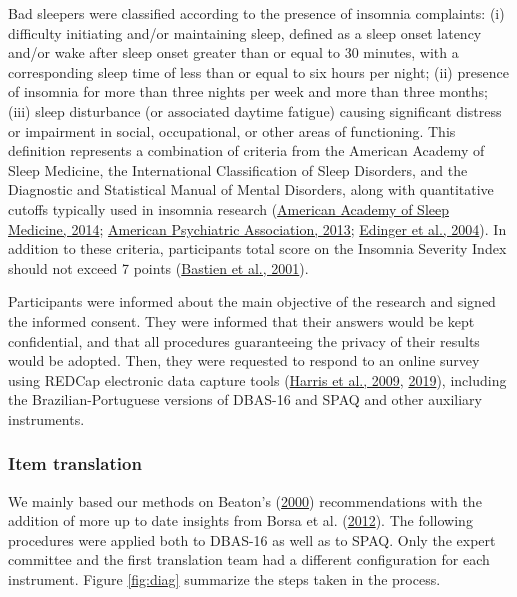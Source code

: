 \documentclass[
  ,doc,11pt, twoside,floatsintext]{apa6}
\begin{document}
Bad sleepers were classified according to the presence of insomnia complaints: (i) difficulty initiating and/or maintaining sleep, defined as a sleep onset latency and/or wake after sleep onset greater than or equal to 30 minutes, with a corresponding sleep time of less than or equal to six hours per night; (ii) presence of insomnia for more than three nights per week and more than three months; (iii) sleep disturbance (or associated daytime fatigue) causing significant distress or impairment in social, occupational, or other areas of functioning. This definition represents a combination of criteria from the American Academy of Sleep Medicine, the International Classification of Sleep Disorders, and the Diagnostic and Statistical Manual of Mental Disorders, along with quantitative cutoffs typically used in insomnia research (\protect\hyperlink{ref-icds2014}{American Academy of Sleep Medicine, 2014}; \protect\hyperlink{ref-americanpsychiatricassociation2013}{American Psychiatric Association, 2013}; \protect\hyperlink{ref-edinger2004}{Edinger et al., 2004}). In addition to these criteria, participants total score on the Insomnia Severity Index should not exceed 7 points (\protect\hyperlink{ref-bastien2001}{Bastien et al., 2001}).

Participants were informed about the main objective of the research and signed the informed consent. They were informed that their answers would be kept confidential, and that all procedures
guaranteeing the privacy of their results would be adopted. Then, they were requested to respond to an online survey using REDCap electronic data capture tools (\protect\hyperlink{ref-harris2009research}{Harris et al., 2009}, \protect\hyperlink{ref-harris2019redcap}{2019}), including the Brazilian-Portuguese versions of DBAS-16 and SPAQ and other auxiliary instruments.

\hypertarget{item-translation}{%
\subsubsection{Item translation}\label{item-translation}}

We mainly based our methods on Beaton's (\protect\hyperlink{ref-beaton2000}{2000}) recommendations with the addition of more up to date insights from Borsa et al. (\protect\hyperlink{ref-borsaAdaptacaoValidacaoInstrumentos2012}{2012}). The following procedures were applied both to DBAS-16 as well as to SPAQ. Only the expert committee and the first translation team had a different configuration for each instrument.
Figure \ref{fig:diag} summarize the steps taken in the process.
\end{document}
